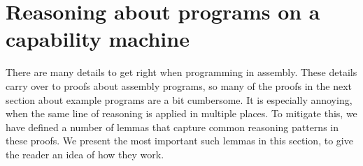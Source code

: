 \documentclass[format=acmsmall, review=true, screen=true]{acmart}
\newenvironment{toplas}{}{}
\newcommand{\itoplassug}[1]{}
\begin{document}
\begin{toplas}
\section{Reasoning about programs on a capability machine}
\label{sec:reasoning}
There are many details to get right when programming in assembly. These details
carry over to proofs about assembly programs, so many of the proofs in the next
section about example programs are a bit cumbersome. It is especially annoying,
when the same line of reasoning is applied in multiple places. To mitigate this,
we have defined a number of lemmas that capture common reasoning patterns in
these proofs. We present the most important such lemmas in this section, to give
the reader an idea of how they work.


\end{toplas}
\end{document}
